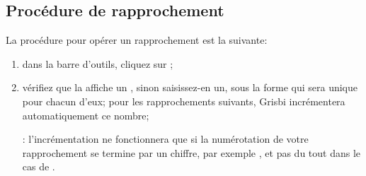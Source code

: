 \subsection{Procédure de rapprochement\label{reconciliation-account-howto}}

La procédure pour opérer un rapprochement est la suivante:
\begin{enumerate}
	\item dans la barre d'outils, cliquez sur ;
	\item vérifiez que la  affiche un , sinon saisissez-en un, sous la forme  qui sera unique pour chacun d'eux; pour les rapprochements suivants, Grisbi incrémentera automatiquement ce nombre;
 
	\Note{}: l'incrémentation ne fonctionnera que si la numérotation de votre rapprochement se termine par un chiffre, par exemple , et pas du tout dans le cas de .
		

\end{enumerate}
